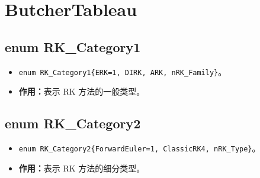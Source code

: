 \documentclass[a4paper,twoside]{ctexart}
\begin{document}
\section{ButcherTableau}
\subsection{enum RK\_Category1}
\begin{itemize}
    \item \texttt{enum RK\_Category1\{ERK=1, DIRK, ARK, nRK\_Family\}}。
    \item \textbf{作用：}表示 RK 方法的一般类型。
\end{itemize}

\subsection{enum RK\_Category2}
\begin{itemize}
    \item \texttt{enum RK\_Category2\{ForwardEuler=1, ClassicRK4, nRK\_Type\}}。
    \item \textbf{作用：}表示 RK 方法的细分类型。
\end{itemize}
\end{document}
